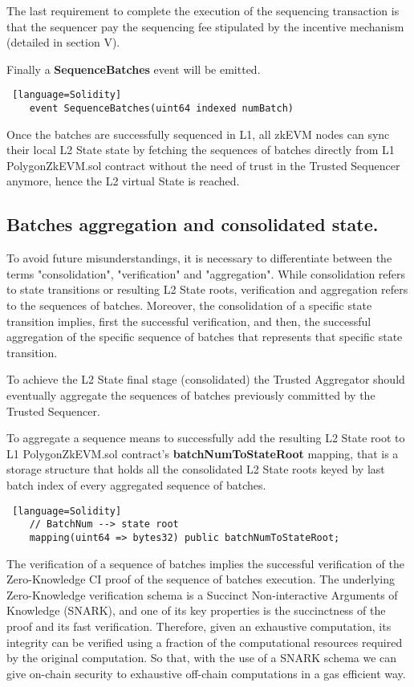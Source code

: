 The last requirement to complete the execution of the sequencing transaction is that the sequencer pay the sequencing fee stipulated by the incentive mechanism (detailed in section V).

Finally a \textbf{SequenceBatches} event will be emitted.

\begin{lstlisting} [language=Solidity]
	event SequenceBatches(uint64 indexed numBatch)
\end{lstlisting}


 Once the batches are successfully sequenced in L1, all zkEVM nodes can sync their local L2 State state by fetching the sequences of batches directly from L1 PolygonZkEVM.sol contract without the need of trust in the Trusted Sequencer anymore, hence the L2 virtual State is reached.


\subsection{Batches aggregation and consolidated state.}

To avoid future misunderstandings, it is necessary to differentiate between the terms "consolidation", "verification" and "aggregation". While consolidation refers to state transitions or resulting L2 State roots, verification and aggregation refers to the sequences of batches. Moreover, the consolidation of a specific state transition implies, first the successful verification, and then, the successful aggregation of the specific sequence of batches that represents that specific state transition.

To achieve the L2 State final stage (consolidated) the Trusted Aggregator should eventually aggregate the sequences of batches previously committed by the Trusted Sequencer. 

To aggregate a sequence means to successfully add the resulting L2 State root to L1 PolygonZkEVM.sol contract's \textbf{batchNumToStateRoot} mapping, that is a storage structure that holds all the consolidated L2 State roots keyed by last batch index of every aggregated sequence of batches. 

\begin{lstlisting} [language=Solidity]
	// BatchNum --> state root
	mapping(uint64 => bytes32) public batchNumToStateRoot;
\end{lstlisting}

The verification of a sequence of batches implies the successful verification of the Zero-Knowledge CI proof of the sequence of batches execution. The underlying Zero-Knowledge verification schema is a Succinct Non-interactive Arguments of Knowledge (SNARK), and one of its key properties is the succinctness of the proof and its fast verification. Therefore, given an exhaustive computation, its integrity can be verified using a fraction of the computational resources required by the original computation. So that, with the use of a SNARK schema we can give on-chain security to exhaustive off-chain computations in a gas efficient way.

